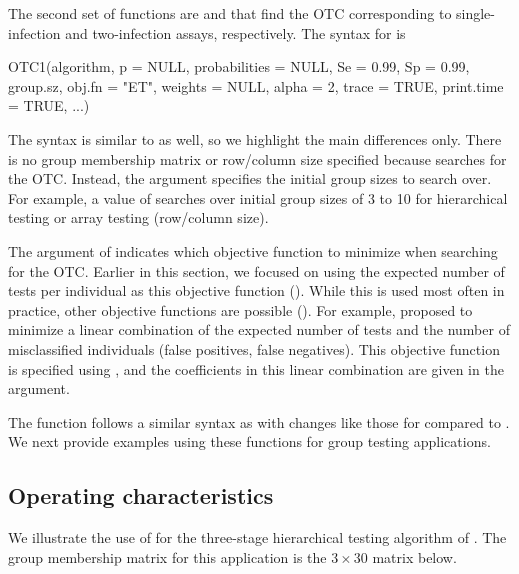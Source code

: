The second set of functions are  and 
that find the OTC corresponding to single-infection and two-infection
assays, respectively. The syntax for  is

\noindent 

\begin{Schunk}
\begin{Sinput}
OTC1(algorithm, p = NULL, probabilities = NULL, Se = 0.99, Sp = 0.99,
    group.sz, obj.fn = "ET", weights = NULL, alpha = 2, trace = TRUE,
    print.time = TRUE, ...)
\end{Sinput}
\end{Schunk}

\noindent \texttt{}The syntax is similar to  as
well, so we highlight the main differences only. There is no group
membership matrix or row/column size specified because 
searches for the OTC. Instead, the  argument specifies
the initial group sizes to search over. For example, a value of 
searches over initial group sizes of 3 to 10 for hierarchical testing
or array testing (row/column size).

The  argument of  indicates which objective
function to minimize when searching for the OTC. Earlier in this section,
we focused on using the expected number of tests per individual as
this objective function (). While this is used
most often in practice, other objective functions are possible (\citealt{hitt2019objective}).
For example, \citet{Graff1972} proposed to minimize a linear combination
of the expected number of tests and the number of misclassified individuals
(false positives, false negatives). This objective function is specified
using , and the coefficients in this linear combination
are given in the  argument.

The  function follows a similar syntax as 
with changes like those for  compared to .
We next provide examples using these functions for group testing applications.

\subsection[Operating characteristics]{Operating characteristics\label{subsec:Operating-characteristics}}

We illustrate the use of  for the three-stage hierarchical
testing algorithm of \citet{lohse2020pooling}. The group membership
matrix for this application is the $3\times30$ matrix below.

